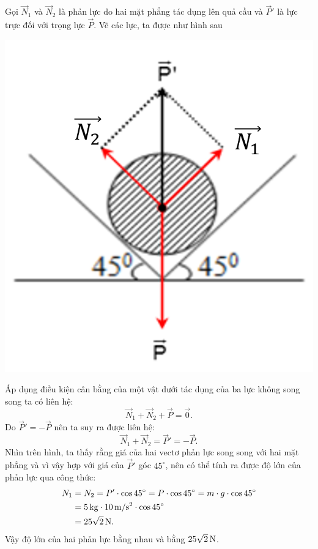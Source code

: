 \begin{enumerate}[label=\bfseries Câu \arabic*:]
	\loigiai
	{Gọi $\vec{N}_1$ và $\vec{N}_2$ là phản lực do hai mặt phẳng tác dụng lên quả cầu và $\vec{P}'$ là lực trực đối với trọng lực $\vec{P}$. Vẽ các lực, ta được như hình sau 
		\begin{center}
			\includegraphics[scale=0.3]{../figs/VN10-2021-PH-TP020-4.png}
		\end{center}
		Áp dụng điều kiện cân bằng của một vật dưới tác dụng của ba lực không song song ta có liên hệ:
		\begin{equation*}
			\vec{N}_1 + \vec{N}_2 + \vec{P}  =\vec{0}. 
		\end{equation*}
		Do $\vec{P}'=-\vec{P}$ nên ta suy ra được liên hệ: 
		\begin{equation*}
			\vec{N}_1 + \vec{N}_2 = \vec{P}'=-\vec{P}.
		\end{equation*}
		Nhìn trên hình, ta thấy rằng giá của hai vectơ phản lực song song với hai mặt phẳng và vì vậy hợp với giá của $\vec{P}'$ góc $45^{\circ}$, nên có thể tính ra được độ lớn của phản lực qua công thức: 
		\begin{align*}
			N_1&=N_2=P'\cdot \cos 45^\circ=P\cdot \cos 45^\circ = m\cdot g \cdot \cos 45^\circ\\
			&=
			\SI{5}{kg}\cdot \SI[parse-numbers=false]{10}{m/s^2} \cdot \cos 45^\circ \\
			&=
			\SI[parse-numbers=false]{25\sqrt{2}}{N}. 
		\end{align*}	
		Vậy độ lớn của hai phản lực bằng nhau và bằng $	\SI[parse-numbers=false]{25\sqrt{2}}{N}$.
	}
\end{enumerate}